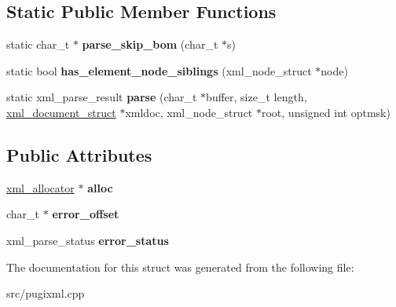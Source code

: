 \subsection*{Static Public Member Functions}
\begin{DoxyCompactItemize}
\item 
\mbox{\label{structxml__parser_af0a3f5a488b05da9fa2c87e1dd1f9eda}} 
static char\+\_\+t $\ast$ {\bfseries parse\+\_\+skip\+\_\+bom} (char\+\_\+t $\ast$s)
\item 
\mbox{\label{structxml__parser_a6be4da5b3206913d0e3bd8320394df41}} 
static bool {\bfseries has\+\_\+element\+\_\+node\+\_\+siblings} (xml\+\_\+node\+\_\+struct $\ast$node)
\item 
\mbox{\label{structxml__parser_a4bf0acd166edf3fc6cc9543002ff6f5d}} 
static xml\+\_\+parse\+\_\+result {\bfseries parse} (char\+\_\+t $\ast$buffer, size\+\_\+t length, \hyperlink{structxml__document__struct}{xml\+\_\+document\+\_\+struct} $\ast$xmldoc, xml\+\_\+node\+\_\+struct $\ast$root, unsigned int optmsk)
\end{DoxyCompactItemize}
\subsection*{Public Attributes}
\begin{DoxyCompactItemize}
\item 
\mbox{\label{structxml__parser_a48f48b81a9a222b8bcb79f95024faad8}} 
\hyperlink{structxml__allocator}{xml\+\_\+allocator} $\ast$ {\bfseries alloc}
\item 
\mbox{\label{structxml__parser_a2476a71cd7e67b3f4bdbcd1323524503}} 
char\+\_\+t $\ast$ {\bfseries error\+\_\+offset}
\item 
\mbox{\label{structxml__parser_a0555859911674e5a7a349447d6533383}} 
xml\+\_\+parse\+\_\+status {\bfseries error\+\_\+status}
\end{DoxyCompactItemize}


The documentation for this struct was generated from the following file\+:\begin{DoxyCompactItemize}
\item 
src/pugixml.\+cpp\end{DoxyCompactItemize}
